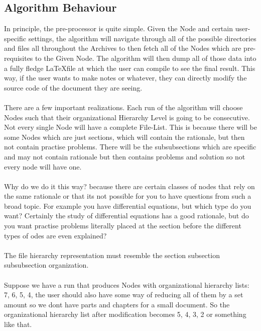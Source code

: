 \documentclass[a4paper, 12pt]{report}
\begin{document}
\begin{center}
\subsection{Algorithm Behaviour}
\begin{comment}
\end{comment}
In principle, the pre-processor is quite simple. Given the Node and certain user-specific settings, the algorithm will navigate through all of the possible directories and files all throughout the Archives to then fetch all of the Nodes which are pre-requisites to the Given Node. The algorithm will then dump all of those data into a fully fledge \LaTeX file at which the user can compile to see the final result. This way, if the user wants to make notes or whatever, they can directly modify the source code of the document they are seeing.
\\~\\There are a few important realizations. Each run of the algorithm will choose Nodes such that their organizational Hierarchy Level is going to be consecutive. 
Not every single Node will have a complete File-List. This is because there will be some Nodes which are just sections, which will contain the rationale, but then not contain practise problems.
There will be the subsubsections which are specific and may not contain rationale but then contains problems and solution so not every node will have one.
\\~\\Why do we do it this way? because there are certain classes of nodes that rely on the same rationale or that its not possible for you to have questions from such a broad topic. For example you have differential equations, but which type do you want? Certainly the study of differential equations has a good rationale, but do you want practise problems literally placed at the section before the different types of odes are even explained?
\\~\\The file hierarchy representation must resemble the section subsection subsubsection organization.
\\~\\Suppose we have a run that produces Nodes with organizational hierarchy lists: 7, 6, 5, 4, the user should also have some way of reducing all of them by a set amount so we dont have parts and chapters for a small document. So the organizational hierarchy list after modification becomes 5, 4, 3, 2 or something like that.

\end{center}
\end{document}
